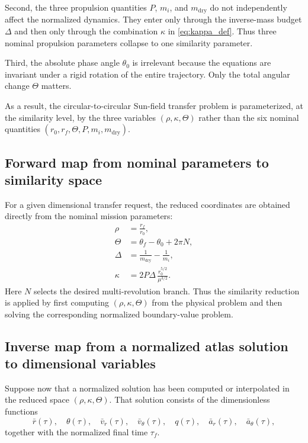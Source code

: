 \documentclass[journal,a4paper]{IEEEtran}
\begin{document}
Second, the three propulsion quantities \(P\), \(m_i\), and \(m_\mathrm{dry}\) do not independently affect the normalized dynamics.
They enter only through the inverse-mass budget \(\Delta\) and then only through the combination \(\kappa\) in \eqref{eq:kappa_def}.
Thus three nominal propulsion parameters collapse to one similarity parameter.

Third, the absolute phase angle \(\theta_0\) is irrelevant because the equations are invariant under a rigid rotation of the entire trajectory.
Only the total angular change \(\Theta\) matters.

As a result, the circular-to-circular Sun-field transfer problem is parameterized, at the similarity level, by the three variables \((\rho,\kappa,\Theta)\) rather than the six nominal quantities \((r_0,r_f,\Theta,P,m_i,m_\mathrm{dry})\).


\subsection{Forward map from nominal parameters to similarity space}
For a given dimensional transfer request, the reduced coordinates are obtained directly from the nominal mission parameters:
\begin{align}
  \rho &= \frac{r_f}{r_0}, \\
  \Theta &= \theta_f-\theta_0+2\pi N, \\
  \Delta &= \frac{1}{m_\mathrm{dry}}-\frac{1}{m_i}, \\
  \kappa &= 2P\Delta\,\frac{r_0^{5/2}}{\mu^{3/2}}.
\end{align}
Here \(N\) selects the desired multi-revolution branch.
Thus the similarity reduction is applied by first computing \((\rho,\kappa,\Theta)\) from the physical problem and then solving the corresponding normalized boundary-value problem.


\subsection{Inverse map from a normalized atlas solution to dimensional variables}
Suppose now that a normalized solution has been computed or interpolated in the reduced space \((\rho,\kappa,\Theta)\).
That solution consists of the dimensionless functions
\[
\bar r(\tau),\quad
\theta(\tau),\quad
\bar v_r(\tau),\quad
\bar v_\theta(\tau),\quad
q(\tau),\quad
\bar a_r(\tau),\quad
\bar a_\theta(\tau),
\]
together with the normalized final time \(\tau_f\).
\end{document}
